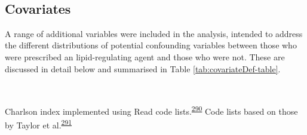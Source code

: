 \documentclass[a4paper, twoside]{templates/ociamthesis}
\begin{document}
~

\hypertarget{covariates}{%
\subsection{Covariates}\label{covariates}}

A range of additional variables were included in the analysis, intended to address the different distributions of potential confounding variables between those who were prescribed an lipid-regulating agent and those who were not. These are discussed in detail below and summarised in Table \ref{tab:covariateDef-table}.

~









Charlson index implemented using Read code lists.\textsuperscript{\protect\hyperlink{ref-khan2010}{290}} Code lists based on those by Taylor et al.\textsuperscript{\protect\hyperlink{ref-taylor2016}{291}}
\end{document}
